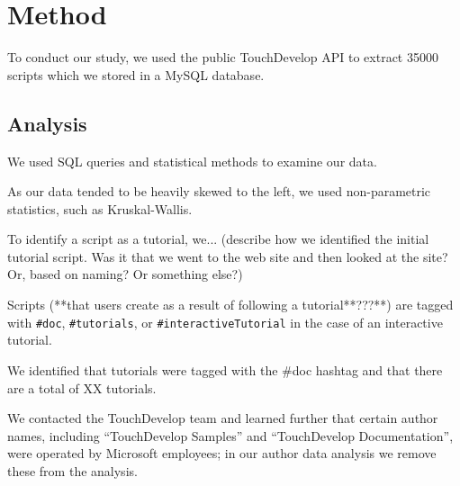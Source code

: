 \section{Method}

To conduct our study, we used the public TouchDevelop API to extract 35000 scripts which we stored in a MySQL database.

\subsection{Analysis}

We used SQL queries and statistical methods to examine our data.

As our data tended to be heavily skewed to the left, we used non-parametric statistics, such as Kruskal-Wallis.

 To identify a script as a tutorial, we... (describe how we identified the initial tutorial script. Was it that we went to the web site and then looked at the site? Or, based on naming? Or something else?)

 Scripts (**that users create as a result of following a tutorial**???**) are tagged with \texttt{\#doc}, \texttt{\#tutorials}, or \texttt{\#interactiveTutorial} in the case of an interactive tutorial.


We identified that tutorials were tagged with the \#doc hashtag and that there are a total of XX tutorials.

We contacted the TouchDevelop team and learned further that certain author names, including ``TouchDevelop Samples'' and ``TouchDevelop Documentation'', were operated by Microsoft employees; in our author data analysis we remove these from the analysis. 

